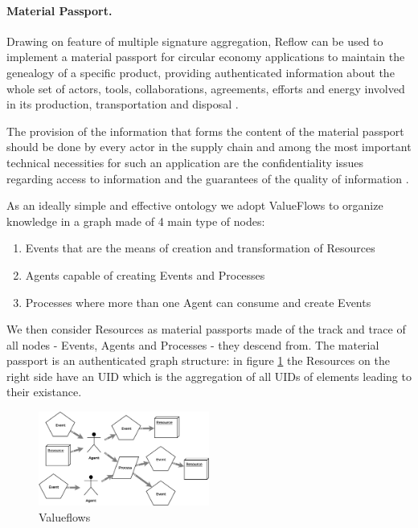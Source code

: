 \documentclass[twocolumn]{article}
\begin{document}
\paragraph*{Material Passport.}
Drawing on feature of multiple signature aggregation, Reflow can
be used to implement a {material passport} for circular economy
applications \citep{material-passport} to maintain the genealogy of a
specific product, providing authenticated information about  the whole
set of actors, tools, collaborations, agreements, efforts and energy
involved in its production, transportation and disposal
\citep{Reflow-os}.

The provision of the information that forms the content of the material
passport should be done by every actor in the supply chain and among the
most important technical necessities for such an application are the
confidentiality issues regarding access to information and the
guarantees of the quality of information \citep{resources-passport}.

As an ideally simple and effective ontology we adopt ValueFlows to organize
knowledge in a graph made of 4 main type of nodes:

\begin{enumerate}
  \item Events that are the means of creation and transformation of Resources
  \item Agents capable of creating Events and Processes
  \item Processes where more than one Agent can consume and create Events
\end{enumerate}

We then consider Resources as material passports made of the track and
trace of all nodes - Events, Agents and Processes - they descend from.
The  material passport is an authenticated graph structure: in figure
\ref{fig:valueflows} the Resources on the right side have an UID which
is the aggregation of all UIDs of elements leading to their existance.

\begin{figure}
  \caption{Valueflows}
  \label{fig:valueflows}
  \centering
  \includegraphics[width=0.5\textwidth]{valueflows.eps}
\end{figure}
\end{document}
